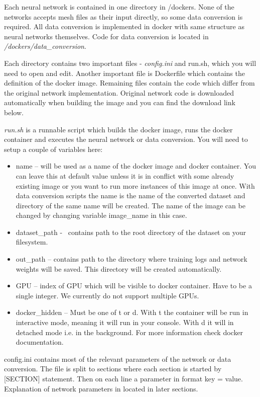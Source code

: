Each neural network is contained in one directory in /dockers. None of the networks accepts mesh files as their input directly, so some data conversion is required. All data conversion is implemented in docker with same structure as neural networks themselves. Code for data conversion is located in \textit{/dockers/data\_conversion}.

Each directory contains two important files - \textit{config.ini} and run.sh, which you will need to open and edit. Another important file is Dockerfile which contains the definition of the docker image. Remaining files contain the code which differ from the original network implementation. Original network code is downloaded automatically when building the image and you can find the download link below.

\textit{run.sh} is a runnable script which builds the docker image, runs the docker container and executes the neural network or data conversion. You will need to setup a couple of variables here:

\begin{itemize}
	\item  {name -- will be used as a name of the docker image and docker container. You can leave this at default value unless it is in conflict with some already existing image or you want to run more instances of this image at once. With data conversion scripts the name is the name of the converted dataset and directory of the same name will be created. The name of the image can be changed by changing variable image\_name in this case.}
	\item{ dataset\_path -  contains path to the root directory of the dataset on your filesystem.}
	\item{out\_path -- contains path to the directory where training logs and network weights will be saved. This directory will be created automatically.}
	\item{ GPU -- index of GPU which will be visible to docker container. Have to be a single integer. We currently do not support multiple GPUs.}
	\item{docker\_hidden -- Must be one of t or d. With t the container will be run in interactive mode, meaning it will run in your console. With d it will in detached mode i.e. in the background. For more information check docker documentation.}
\end{itemize}

config.ini contains most of the relevant parameters of the network or data conversion. The file is split to sections where each section is started by [SECTION] statement. Then on each line a parameter in format key = value. Explanation of network parameters in located in later sections.

